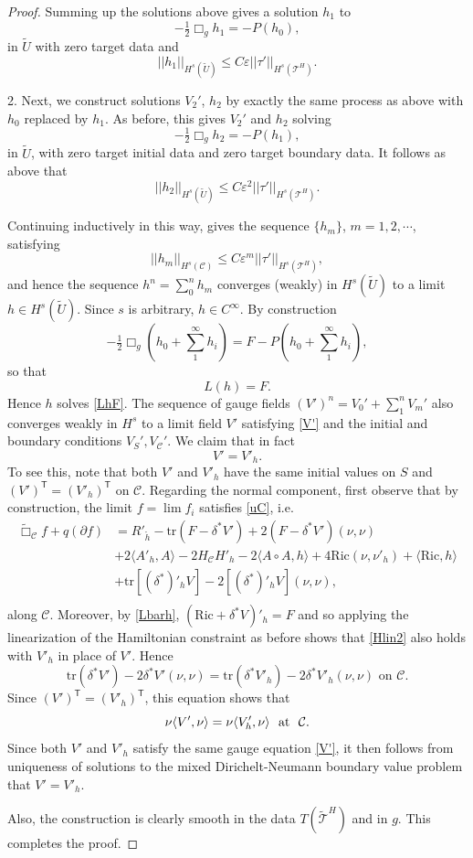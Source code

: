 \documentclass[10pt]{amsart}
\renewcommand{\d}{\delta}
\newcommand{\e}{\varepsilon}
\newcommand{\cC}{{\mathcal C}}
\newcommand{\cT}{{\mathcal T}}
\newcommand{\Ric}{\mathrm{Ric}}
\newcommand{\tT}{\mathsf{T}}
\newcommand{\be}{\begin{equation}}
\newcommand{\ee}{\end{equation}}
\newcommand{\tr}{\mathrm{tr}}
\newcommand{\p}{\partial}
\newcommand{\<}{\langle}
\renewcommand{\>}{\rangle}
\newcommand{\w}{\widetilde}
\theoremstyle{plain}
\theoremstyle{remark}
\theoremstyle{definition}
\numberwithin{equation}{section}
\begin{document}
\begin{proof}
     Summing up the solutions above gives a solution $h_1$ to 
$$-\tfrac{1}{2}\Box_g h_1 = -P(h_0),$$
in $\w U$ with zero target data and 
$$||h_1||_{H^s(\w U)} \leq C \e ||\tau'||_{H^s(\cT^H)}.$$
         
2. Next, we construct solutions $V_2'$, $h_2$ by exactly the same process as above with $h_0$ replaced by $h_1$. 
As before, this gives $V_2'$ and $h_2$ solving 
$$-\tfrac{1}{2}\Box_g h_2  = -P(h_1),$$
in $\w U$, with zero target initial data and zero target boundary data.  It follows as above that  
$$||h_2||_{H^s(\w U)} \leq C \e^2 ||\tau'||_{H^s(\cT^H)}.$$

   Continuing inductively in this way, gives the sequence $\{h_m\}$, $m = 1,2, \cdots$, satisfying  
$$||h_m||_{H^s(\cC)} \leq C \e^m ||\tau'||_{H^s(\cT^H)},$$
and hence the sequence $h^n = \sum_0^n h_m$ converges (weakly) in $H^s(\w U)$ to a limit $h \in H^s(\w U)$. Since $s$ is arbitrary, $h \in C^{\infty}$. 
By construction 
$$-\tfrac{1}{2}\Box_g(h_0 + \sum_1^{\infty} h_i)  = F - P(h_0 + \sum_1^{\infty} h_i),$$
so that 
\be \label{Lbarh}
L(h) = F.
\ee
Hence $h$ solves \eqref{LhF}. The sequence of gauge fields $(V')^n  = V_0' + \sum_1^{n}V_m'$ also converges weakly in $H^s$ to a limit field $V'$ 
satisfying \eqref{V'} and the initial and boundary conditions $V_S', V_{\cC}'$. We claim that in fact 
$$V' = V'_h.$$ 
To see this, note that both $V'$ and $V'_h$ have the same initial values on $S$ and $(V')^{\tT} = (V'_h)^{\tT}$ on $\cC$. Regarding the 
normal component, first observe that by construction, the limit $f = \lim f_i$ satisfies \eqref{uC}, i.e. 
\be \label{Hlin2}
\begin{split} 
\w \Box_{\cC} f + q(\p f) & =  R'_{\ring{h}} - \tr(F - \d^* V') + 2(F - \d^* V')(\nu,\nu)\\
 &+2\<A'_h, A\> - 2H_\cC H'_h - 2\<A\circ A, h\> + 4\Ric(\nu,\nu'_h) + \<\Ric, h\>\\
&+ \tr [(\d^*)'_h V] - 2[(\d^*)'_h V](\nu,\nu), \\
\end{split}
\ee
along $\cC$. Moreover, by \eqref{Lbarh}, $(\Ric + \d^*V)'_h = F$ and so applying the linearization of the Hamiltonian constraint as before shows 
that \eqref{Hlin2} also holds with $V'_h$ in place of $V'$. Hence  
$$\tr(\d^*V')-2\d^* V'(\nu,\nu) = \tr(\d^* V'_h) - 2\d^*  V'_h(\nu,\nu) \mbox{ on }\cC.$$
Since $(V')^{\tT} = (V'_h)^{\tT}$, this equation shows that 
$$\nu \<V', \nu\> = \nu\<V'_h, \nu\> \ \ {\rm at} \ \ \cC.$$
Since both $V'$ and $V'_h$ satisfy the same gauge equation \eqref{V'}, it then follows from uniqueness of solutions to the mixed Dirichelt-Neumann 
boundary value problem that $V' = V'_h$. 

Also, the construction is clearly smooth in the data $T(\w \cT^H)$ and in $g$. This completes the proof. 


\end{proof}
\end{document}
